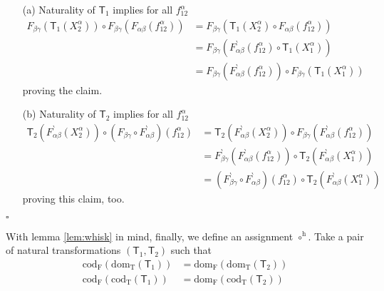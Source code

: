 \begin{prf}
\begin{enumerate}
\item[(a)]
Naturality of $\mathsf{T}_{1}$ implies for all $f_{12}^{\alpha}$
\begin{align*}
  F_{\beta\gamma}
  \left(
    \mathsf{T}_{1}(X_{2}^{\alpha})
  \right)
  \circ
  F_{\beta\gamma}
  \left(
    F_{\alpha\beta}(f_{12}^{\alpha})
  \right)
  &=
  F_{\beta\gamma}
  \left(
    \mathsf{T}_{1}(X_{2}^{\alpha})
    \circ
    F_{\alpha\beta}(f_{12}^{\alpha})
  \right)
  \\
  &=
  F_{\beta\gamma}
  \left(
    F_{\alpha\beta}^{\backprime}(f_{12}^{\alpha})
    \circ
    \mathsf{T}_{1}(X_{1}^{\alpha})
  \right)
  \\
  &=
  F_{\beta\gamma}
  \left(
    F_{\alpha\beta}^{\backprime}(f_{12}^{\alpha})
  \right)
  \circ
  F_{\beta\gamma}
  \left(
    \mathsf{T}_{1}(X_{1}^{\alpha})
  \right)
\end{align*}
proving the claim.
\item[(b)]
Naturality of $\mathsf{T}_{2}$ implies for all $f_{12}^{\alpha}$
\begin{align*}
  \mathsf{T}_{2}
  \left(
    F_{\alpha\beta}^{\backprime}(X_{2}^{\alpha})
  \right)
  \circ
  \left(
    F_{\beta\gamma}
    \circ
    F_{\alpha\beta}^{\backprime}
  \right)
  (f_{12}^{\alpha})
  &=
  \mathsf{T}_{2}
  \left(
    F_{\alpha\beta}^{\backprime}(X_{2}^{\alpha})
  \right)
  \circ
  F_{\beta\gamma}
  \left(
    F_{\alpha\beta}^{\backprime}(f_{12}^{\alpha})
  \right)
  \\
  &=
  F_{\beta\gamma}^{\backprime}
  \left(
    F_{\alpha\beta}^{\backprime}(f_{12}^{\alpha})
  \right)
  \circ
  \mathsf{T}_{2}
  \left(
    F_{\alpha\beta}^{\backprime}(X_{1}^{\alpha})
  \right)
  \\
  &=
  \left(
    F_{\beta\gamma}^{\backprime}
    \circ
    F_{\alpha\beta}^{\backprime}
  \right)
  (f_{12}^{\alpha})
  \circ
  \mathsf{T}_{2}
  \left(
    F_{\alpha\beta}^{\backprime}(X_{1}^{\alpha})
  \right)
\end{align*}
proving this claim, too.
\end{enumerate}
\phantom{proven}
\hfill
$\square$
\end{prf}
With lemma \ref{lem:whisk} in mind, finally, we define an assignment $\circ^{\textrm{h}}$. Take a pair of natural transformations $(\mathsf{T}_{1},\mathsf{T}_{2})$ such that
\begin{align*}
  \mathrm{cod_{F}}
  \left(
    \mathrm{dom_{T}}(\mathsf{T}_{1})
  \right)
  &=
  \mathrm{dom_{F}}
  \left(
    \mathrm{dom_{T}}(\mathsf{T}_{2})
  \right)
  \\
  \mathrm{cod_{F}}
  \left(
    \mathrm{cod_{T}}(\mathsf{T}_{1})
  \right)
  &=
  \mathrm{dom_{F}}
  \left(
    \mathrm{cod_{T}}(\mathsf{T}_{2})
  \right)
\end{align*}
